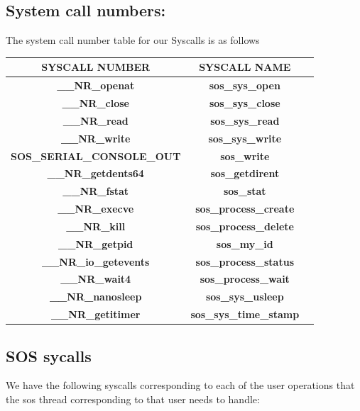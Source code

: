\subsection{System call numbers:}
\noindent The system call number table for our Syscalls is as follows


\begin{center}
    \begin{tabular}{ |c|c|c| }
    \hline 
    \textbf{SYSCALL NUMBER} & \textbf{SYSCALL NAME} \\
    \hline
    \textbf{\_\_NR\_openat} & \textbf{sos\_sys\_open}\\ 
    \hline
    \textbf{\_\_NR\_close} &  \textbf{sos\_sys\_close}\\ 
    \hline
    \textbf{\_\_NR\_read} &  \textbf{sos\_sys\_read}\\ 
    \hline
    \textbf{\_\_NR\_write} & \textbf{sos\_sys\_write} \\
    \hline
    \textbf{SOS\_SERIAL\_CONSOLE\_OUT} & \textbf{sos\_write} \\
    \hline
    \textbf{\_\_NR\_getdents64} & \textbf{sos\_getdirent} \\
    \hline
    \textbf{\_\_NR\_fstat} & \textbf{sos\_stat} \\
    \hline
    \textbf{\_\_NR\_execve} & \textbf{sos\_process\_create} \\
    \hline
    \textbf{\_\_NR\_kill} & \textbf{sos\_process\_delete} \\
    \hline
    \textbf{\_\_NR\_getpid} & \textbf{sos\_my\_id} \\
    \hline
    \textbf{\_\_NR\_io\_getevents} & \textbf{sos\_process\_status} \\
    \hline
    \textbf{\_\_NR\_wait4} & \textbf{sos\_process\_wait} \\
    \hline
    \textbf{\_\_NR\_nanosleep} & \textbf{sos\_sys\_usleep} \\
    \hline
    \textbf{\_\_NR\_getitimer} & \textbf{sos\_sys\_time\_stamp} \\
    \hline
    \end{tabular}
\end{center} 

\subsection{SOS sycalls}
\noindent We have the following syscalls corresponding to each of the user operations that the sos thread corresponding to that user needs to handle: \\


